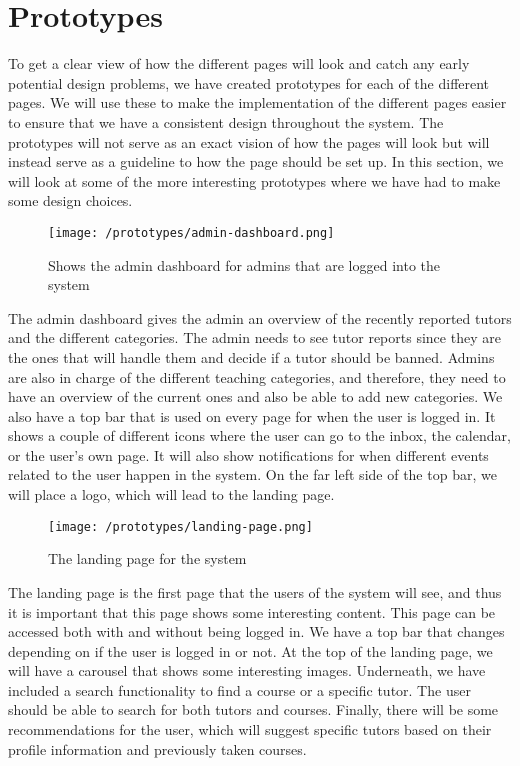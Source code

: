 \section{Prototypes}
To get a clear view of how the different pages will look and catch any early potential design problems, we have created prototypes for each of the different pages. 
We will use these to make the implementation of the different pages easier to ensure that we have a consistent design throughout the system. 
The prototypes will not serve as an exact vision of how the pages will look but will instead serve as a guideline to how the page should be set up.
In this section, we will look at some of the more interesting prototypes where we have had to make some design choices.
\begin{figure}[H]
    \texttt{[image: /prototypes/admin-dashboard.png]}
     \caption{Shows the admin dashboard for admins that are logged into the system}
     \label{fig:admin-dashboard}
 \end{figure}
The admin dashboard gives the admin an overview of the recently reported tutors and the different categories. 
The admin needs to see tutor reports since they are the ones that will handle them and decide if a tutor should be banned. 
Admins are also in charge of the different teaching categories, and therefore, they need to have an overview of the current ones and also be able to add new categories.
We also have a top bar that is used on every page for when the user is logged in. It shows a couple of different icons where the user can go to the inbox, the calendar, or the user's own page. 
It will also show notifications for when different events related to the user happen in the system. 
On the far left side of the top bar, we will place a logo, which will lead to the landing page.
\begin{figure}[H]
   \texttt{[image: /prototypes/landing-page.png]}
    \caption{The landing page for the system}
    \label{fig:landing-page}
\end{figure}
The landing page is the first page that the users of the system will see, and thus it is important that this page shows some interesting content. 
This page can be accessed both with and without being logged in. 
We have a top bar that changes depending on if the user is logged in or not. 
At the top of the landing page, we will have a carousel that shows some interesting images.
Underneath, we have included a search functionality to find a course or a specific tutor. 
The user should be able to search for both tutors and courses. 
Finally, there will be some recommendations for the user, which will suggest specific tutors based on their profile information and previously taken courses.

